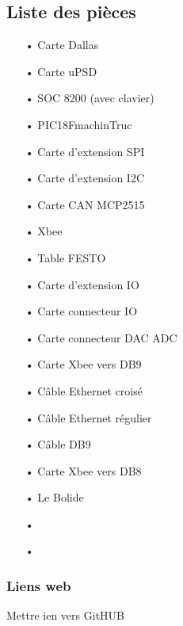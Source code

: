 \documentclass[10pt,a4paper,final]{article}
\begin{document}
\begin{spacing}{1.5}
\subsection{Liste des pièces}
\begin{center}
\HRule
\end{center}
\begin{multicols}{3}
\begin{itemize}
\item[•]Carte Dallas
\item[•]Carte uPSD
\item[•]SOC 8200 (avec clavier)
\item[•]PIC18FmachinTruc
\item[•]Carte d'extension SPI
\item[•]Carte d'extension I2C
\item[•]Carte CAN MCP2515
\item[•]Xbee
\item[•]Table FESTO
\item[•]Carte d'extension IO
\item[•]Carte connecteur IO
\item[•]Carte connecteur DAC ADC
\item[•]Carte Xbee vers DB9
\item[•]Câble Ethernet croisé
\item[•]Câble Ethernet régulier
\item[•]Câble DB9
\item[•]Carte Xbee vers DB8
\item[•]Le Bolide
\item[•]
\item[•]
\end{itemize}
\end{multicols}
\begin{center}
\HRule
\end{center}

\subsubsection{Liens web}
Mettre ien vers GitHUB
\pagebreak

\end{spacing}
\end{document}
